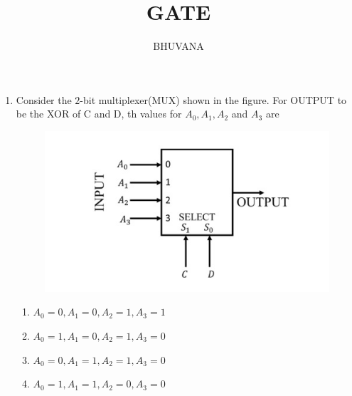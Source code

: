 \documentclass{article}
\begin{document}
 \title{GATE}
 \author{BHUVANA}
 \maketitle

 \begin{enumerate}
 \item

	 Consider the $2$-bit multiplexer(MUX) shown in the figure. For OUTPUT to be the XOR of C and D, th values for $A_0,A_1,A_2$ and $A_3$  are \underline{\hspace{50pt}}
	 \begin{figure}[h]
		 \centering
		 \includegraphics[width=\columnwidth]{pics/gatepic.jpg}
		 \label{fig:MUX}
	\end{figure}
	 \begin{enumerate}[label=(\Alph*)]
		\item $A_0=0,A_1=0,A_2=1,A_3=1$
		\item $A_0=1,A_1=0,A_2=1,A_3=0$
		\item $A_0=0,A_1=1,A_2=1,A_3=0$
		\item $A_0=1,A_1=1,A_2=0,A_3=0$
	\end{enumerate}
 \end{enumerate}
\end{document}
